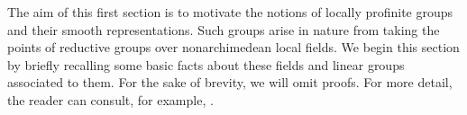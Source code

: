 The aim of this first section is to motivate the notions of locally profinite groups and their smooth representations. Such groups arise in nature from taking the points of reductive groups over nonarchimedean local fields. We begin this section by briefly recalling some basic facts about these fields and linear groups associated to them. For the sake of brevity, we will omit proofs. For more detail, the reader can consult, for example, \cite{Gou1}.






\newpage

